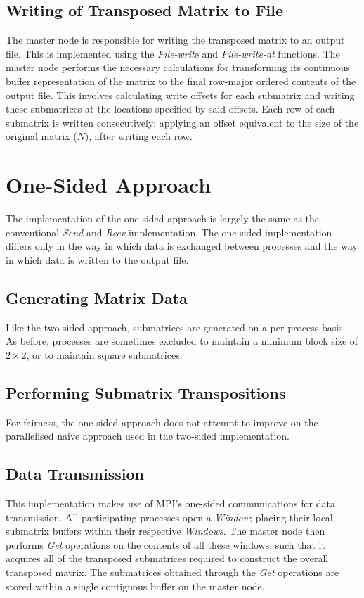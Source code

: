 \documentclass[journal,10pt,a4paper]{IEEEtran}
\begin{document}
\subsection{Writing of Transposed Matrix to File}

The master node is responsible for writing the transposed matrix to an output file. This is implemented using the \textit{File-writ}e and \textit{File-write-at} functions. The master node performs the necessary calculations for transforming its continuous buffer representation of the matrix to the final row-major ordered contents of the output file. This involves calculating write offsets for each submatrix and writing these submatrices at the locations specified by said offsets. Each row of each submatrix is written consecutively; applying an offset equivalent to the size of the original matrix ($N$), after writing each row.



\section{One-Sided Approach}

The implementation of the one-sided approach is largely the same as the conventional \textit{Send} and \textit{Recv} implementation. The one-sided implementation differs only in the way in which data is exchanged between processes and the way in which data is written to the output file.

\subsection{Generating Matrix Data}
Like the two-sided approach, submatrices are generated on a per-process basis. As before, processes are sometimes excluded to maintain a minimum block size of $2 \times 2$, or to maintain square submatrices.


\subsection{Performing Submatrix Transpositions}
For fairness, the one-sided approach does not attempt to improve on the parallelised naive approach used in the two-sided implementation.

\subsection{Data Transmission}
This implementation makes use of MPI's one-sided communications for data transmission. All participating processes open a \textit{Window}; placing their local submatrix buffers within their respective \textit{Windows}. The master node then performs \textit{Get} operations on the contents of all these windows, such that it acquires all of the transposed submatrices required to construct the overall transposed matrix. The submatrices obtained through the \textit{Get} operations are stored within a single contiguous buffer on the master node.
\end{document}
